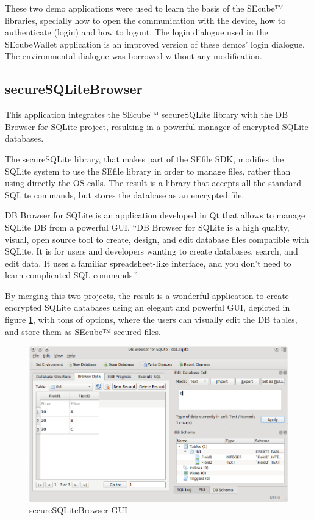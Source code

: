 These two demo applications were used to learn the basis of the SEcube™ libraries, specially how to open the communication with the device, how to authenticate (login) and how to logout. The login dialogue used in the SEcubeWallet application is an improved version of these demos' login dialogue. The environmental dialogue was borrowed without any modification.

\subsection{secureSQLiteBrowser}

This application integrates the SEcube™ secureSQLite library with the DB Browser for SQLite\cite{SQLitebro} project, resulting in a powerful manager of encrypted SQLite databases.

The secureSQLite library, that makes part of the SEfile SDK, modifies the SQLite system to use the SEfile library in order to manage files, rather than using directly the OS calls. The result is a library that accepts all the standard SQLite commands, but stores the database as an encrypted file.

DB Browser for SQLite is an application developed in Qt that allows to manage SQLite DB from a powerful GUI. ``DB Browser for SQLite is a high quality, visual, open source tool to create, design, and edit database files compatible with SQLite. It is for users and developers wanting to create databases, search, and edit data. It uses a familiar spreadsheet-like interface, and you don't need to learn complicated SQL commands.'' \cite{SQLitebro}

By merging this two projects, the result is a wonderful application to create encrypted SQLite databases using an elegant and powerful GUI, depicted in figure \ref{fig:sqlitebro}, with tons of options, where the users can visually edit the DB tables, and store them as SEcube™ secured files. 

\begin{figure}[htb]
  \centering
  \captionsetup{justification=centering}
  \centerline{\includegraphics[width=1\columnwidth]{chapters/figures/related/sqlitebro.png}}
  \caption{secureSQLiteBrowser GUI}
  \label{fig:sqlitebro}
\end{figure}

